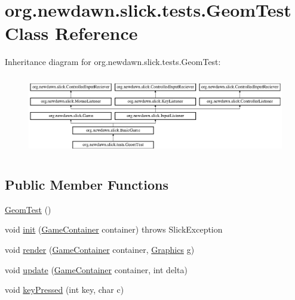 \hypertarget{classorg_1_1newdawn_1_1slick_1_1tests_1_1_geom_test}{}\section{org.\+newdawn.\+slick.\+tests.\+Geom\+Test Class Reference}
\label{classorg_1_1newdawn_1_1slick_1_1tests_1_1_geom_test}
Inheritance diagram for org.\+newdawn.\+slick.\+tests.\+Geom\+Test\+:\begin{figure}[H]
\begin{center}
\leavevmode
\includegraphics[height=3.522012cm]{classorg_1_1newdawn_1_1slick_1_1tests_1_1_geom_test}
\end{center}
\end{figure}
\subsection*{Public Member Functions}
\begin{DoxyCompactItemize}
\item 
\mbox{\hyperlink{classorg_1_1newdawn_1_1slick_1_1tests_1_1_geom_test_a2f4f50a6ee99e1b6d3441b72bc1f1e40}{Geom\+Test}} ()
\item 
void \mbox{\hyperlink{classorg_1_1newdawn_1_1slick_1_1tests_1_1_geom_test_a5ef0548c063e670c9c731d9322d4c8df}{init}} (\mbox{\hyperlink{classorg_1_1newdawn_1_1slick_1_1_game_container}{Game\+Container}} container)  throws Slick\+Exception 
\item 
void \mbox{\hyperlink{classorg_1_1newdawn_1_1slick_1_1tests_1_1_geom_test_a41b6c864edf3f31e2f758ec80b8791bc}{render}} (\mbox{\hyperlink{classorg_1_1newdawn_1_1slick_1_1_game_container}{Game\+Container}} container, \mbox{\hyperlink{classorg_1_1newdawn_1_1slick_1_1_graphics}{Graphics}} g)
\item 
void \mbox{\hyperlink{classorg_1_1newdawn_1_1slick_1_1tests_1_1_geom_test_a41c184dc80983f6161e27122f65713f4}{update}} (\mbox{\hyperlink{classorg_1_1newdawn_1_1slick_1_1_game_container}{Game\+Container}} container, int delta)
\item 
void \mbox{\hyperlink{classorg_1_1newdawn_1_1slick_1_1tests_1_1_geom_test_a642a873782025487f7553ddb7e77eca1}{key\+Pressed}} (int key, char c)
\end{DoxyCompactItemize}
